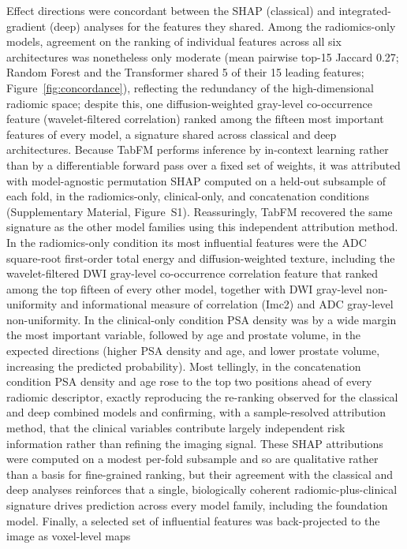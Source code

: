 \documentclass[11pt]{article}
\begin{document}
Effect directions were concordant between the SHAP (classical) and
integrated-gradient (deep) analyses for the features they shared. Among the
radiomics-only models, agreement on the ranking of individual features across all
six architectures was nonetheless only moderate (mean pairwise top-15 Jaccard
0.27; Random Forest and the Transformer shared 5 of their 15 leading features;
Figure~\ref{fig:concordance}), reflecting the redundancy of the high-dimensional
radiomic space; despite this, one diffusion-weighted gray-level co-occurrence
feature (wavelet-filtered correlation) ranked among the fifteen most important
features of every model, a signature shared across classical and deep
architectures. Because TabFM performs inference by in-context learning rather
than by a differentiable forward pass over a fixed set of weights, it was
attributed with model-agnostic permutation SHAP computed on a held-out
subsample of each fold, in the radiomics-only, clinical-only, and concatenation
conditions (Supplementary Material, Figure~S1). Reassuringly, TabFM recovered the same
signature as the other model families using this independent attribution
method. In the radiomics-only condition its most influential features were the
ADC square-root first-order total energy and diffusion-weighted texture,
including the wavelet-filtered DWI gray-level co-occurrence correlation feature
that ranked among the top fifteen of every other model, together with DWI
gray-level non-uniformity and informational measure of correlation (Imc2) and
ADC gray-level non-uniformity. In the clinical-only condition PSA density was by
a wide margin the most important variable, followed by age and prostate volume,
in the expected directions (higher PSA density and age, and lower prostate
volume, increasing the predicted probability). Most tellingly, in the
concatenation condition PSA density and age rose to the top two positions ahead
of every radiomic descriptor, exactly reproducing the re-ranking observed for
the classical and deep combined models and confirming, with a sample-resolved
attribution method, that the clinical variables contribute largely independent
risk information rather than refining the imaging signal. These SHAP
attributions were computed on a modest per-fold subsample and so are
qualitative rather than a basis for fine-grained ranking, but their agreement
with the classical and deep analyses reinforces that a single, biologically
coherent radiomic-plus-clinical signature drives prediction across every model
family, including the foundation model. Finally, a selected
set of influential features was back-projected to the image as voxel-level maps
\end{document}
